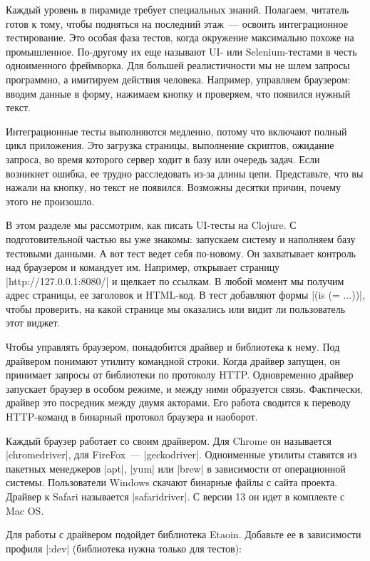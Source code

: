 Каждый уровень в пирамиде требует специальных знаний. Полагаем, читатель готов к
тому, чтобы подняться на последний этаж~--- освоить интеграционное
тестирование. Это особая фаза тестов, когда окружение максимально похоже на
промышленное. По-другому их еще называют UI- или Selenium-тестами в честь
одноименного фреймворка. Для большей реалистичности мы не шлем запросы
программно, а имитируем действия человека. Например, управляем браузером: вводим
данные в форму, нажимаем кнопку и проверяем, что появился нужный текст.

Интеграционные тесты выполняются медленно, потому что включают полный цикл
приложения. Это загрузка страницы, выполнение скриптов, ожидание запроса, во
время которого сервер ходит в базу или очередь задач. Если возникнет ошибка, ее
трудно расследовать из-за длины цепи. Представьте, что вы нажали на кнопку, но
текст не появился. Возможны десятки причин, почему этого не произошло.

В этом разделе мы рассмотрим, как писать UI-тесты на Clojure. С подготовительной
частью вы уже знакомы: запускаем систему и наполняем базу тестовыми данными. А
вот тест ведет себя по-новому. Он захватывает контроль над браузером и командует
им. Например, открывает страницу \spverb|http://127.0.0.1:8080/| и щелкает по
ссылкам. В любой момент мы получим адрес страницы, ее заголовок и HTML-код. В
тест добавляют формы \spverb|(is (= ...))|, чтобы проверить, на какой странице мы
оказались или видит ли пользователь этот виджет.

Чтобы управлять браузером, понадобится драйвер и библиотека к нему. Под
драйвером понимают утилиту командной строки. Когда драйвер запущен, он принимает
запросы от библиотеки по протоколу HTTP. Одновременно драйвер запускает браузер
в особом режиме, и между ними образуется связь. Фактически, драйвер это
посредник между двумя акторами. Его работа сводится к переводу HTTP-команд в
бинарный протокол браузера и наоборот.

Каждый браузер работает со своим драйвером. Для Chrome он называется
\spverb|chromedriver|, для FireFox~--- \spverb|geckodriver|. Одноименные утилиты ставятся из
пакетных менеджеров \spverb|apt|, \spverb|yum| или \spverb|brew| в зависимости от операционной
системы. Пользователи Windows скачают бинарные файлы с сайта проекта. Драйвер к
Safari называется \spverb|safaridriver|. С версии 13 он идет в комплекте с Mac OS.

Для работы с драйвером подойдет библиотека Etaoin.
Добавьте ее в зависимости профиля \spverb|:dev| (библиотека нужна только для тестов):


